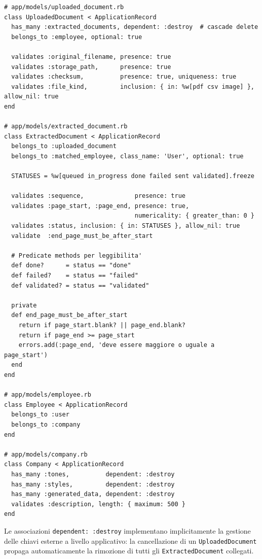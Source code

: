 \documentclass[a4paper,11pt]{article}
\newcommand{\code}[1]{\texttt{#1}}
\begin{document}
\begin{lstlisting}[caption={Modelli principali -- associazioni, validazioni e predicate methods}]
# app/models/uploaded_document.rb
class UploadedDocument < ApplicationRecord
  has_many :extracted_documents, dependent: :destroy  # cascade delete
  belongs_to :employee, optional: true

  validates :original_filename, presence: true
  validates :storage_path,      presence: true
  validates :checksum,          presence: true, uniqueness: true
  validates :file_kind,         inclusion: { in: %w[pdf csv image] }, allow_nil: true
end

# app/models/extracted_document.rb
class ExtractedDocument < ApplicationRecord
  belongs_to :uploaded_document
  belongs_to :matched_employee, class_name: 'User', optional: true

  STATUSES = %w[queued in_progress done failed sent validated].freeze

  validates :sequence,              presence: true
  validates :page_start, :page_end, presence: true,
                                    numericality: { greater_than: 0 }
  validates :status, inclusion: { in: STATUSES }, allow_nil: true
  validate  :end_page_must_be_after_start

  # Predicate methods per leggibilita'
  def done?      = status == "done"
  def failed?    = status == "failed"
  def validated? = status == "validated"

  private
  def end_page_must_be_after_start
    return if page_start.blank? || page_end.blank?
    return if page_end >= page_start
    errors.add(:page_end, 'deve essere maggiore o uguale a page_start')
  end
end

# app/models/employee.rb
class Employee < ApplicationRecord
  belongs_to :user
  belongs_to :company
end

# app/models/company.rb
class Company < ApplicationRecord
  has_many :tones,          dependent: :destroy
  has_many :styles,         dependent: :destroy
  has_many :generated_data, dependent: :destroy
  validates :description, length: { maximum: 500 }
end
\end{lstlisting}

Le associazioni \code{dependent: :destroy} implementano implicitamente la
gestione delle chiavi esterne a livello applicativo: la cancellazione di un
\code{UploadedDocument} propaga automaticamente la rimozione di tutti gli
\code{ExtractedDocument} collegati.

\end{document}
